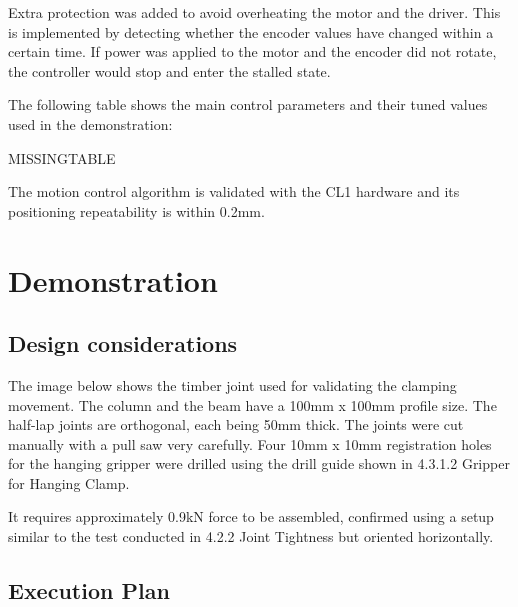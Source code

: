 Extra protection was added to avoid overheating the motor and the driver. This is implemented by detecting whether the encoder values have changed within a certain time. If power was applied to the motor and the encoder did not rotate, the controller would stop and enter the stalled state. 

The following table shows the main control parameters and their tuned values used in the demonstration:

MISSINGTABLE

The motion control algorithm is validated with the CL1 hardware and its positioning repeatability is within 0.2mm.

\section{Demonstration}
\label{section:exploration_1_demonstration}

\subsection{Design considerations}
\label{subsection:exploration_1_design_considerations}

The image below shows the timber joint used for validating the clamping movement. The column and the beam have a 100mm x 100mm profile size. The half-lap joints are orthogonal, each being 50mm thick. The joints were cut manually with a pull saw very carefully. Four 10mm x 10mm registration holes for the hanging gripper were drilled using the drill guide shown in 4.3.1.2 Gripper for Hanging Clamp.

It requires approximately 0.9kN force to be assembled, confirmed using a setup similar to the test conducted in 4.2.2 Joint Tightness but oriented horizontally.
\subsection{Execution Plan}
\label{subsection:exploration_1_execution_plan}

